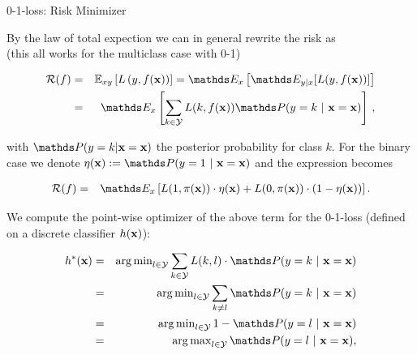 \documentclass[11pt,compress,t,notes=noshow, xcolor=table]{beamer}
\begin{document}
\begin{vbframe}{0-1-loss: Risk Minimizer}

By the law of total expection we can in general rewrite the risk as\\
(this all works for the multiclass case with 0-1)

\vspace*{-0.5cm}

\begin{eqnarray*}
  \riskf  & = & \Exy\left[\Lxy\right] = \E_x \left[ \E_{y|x} [ L(y, \fx) ] \right] \\
          & = & \E_x \left[\sum_{k \in \Yspace} L(k, \fx) \P(y = k~|~ \xv = \xv)\right]\,, 
\end{eqnarray*}

with $\P(y = k| \xv = \xv)$ the posterior probability for class $k$. For the binary case we denote $\eta(\xv) := \P(y = 1 ~|~ \xv = \xv)$ and the expression becomes 

\vspace*{-0.3cm}


\begin{eqnarray*}
  \riskf &=& \E_x \left[L(1, \pix) \cdot \eta(\xv) + L(0, \pix) \cdot (1 - \eta(\xv)) \right]. 
\end{eqnarray*}







\framebreak 

We compute the point-wise optimizer of the above term for the 0-1-loss (defined on a discrete classifier $h(\mathbf{x})$): 

  \begin{eqnarray*}  
  \hxbayes &=& \argmin_{l \in \Yspace} \sum_{k \in \Yspace} L(k, l) \cdot \P(y = k~|~\xv = \xv) \\
  &=& \argmin_{l \in \Yspace} \sum_{k \ne l} \P(y = k~|~\xv = \xv) \\ 
  &=& \argmin_{l \in \Yspace} 1 - \P(y = l~|~\xv = \xv) \\
  &=& \argmax_{l \in \Yspace} \P(y = l~|~ \xv = \xv),
  \end{eqnarray*}


\end{vbframe}
\end{document}
